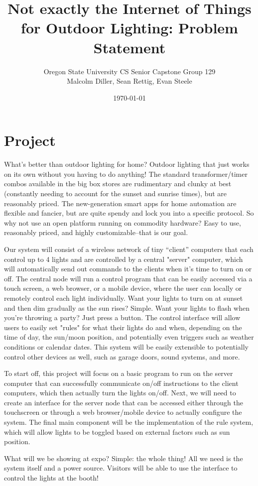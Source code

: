 \documentclass{article}
\title{Not exactly the Internet of Things for Outdoor Lighting: Problem Statement}
\author{Oregon State University CS Senior Capstone Group 129\\Malcolm Diller, Sean Rettig, Evan Steele}
\date{\today}
\begin{document}
\maketitle

\section{Project}

What's better than outdoor lighting for home?  Outdoor lighting that just works
on its own without you having to do anything!  The standard transformer/timer
combos available in the big box stores are rudimentary and clunky at best
(constantly needing to account for the sunset and sunrise times), but are
reasonably priced. The new-generation smart apps for home automation are
flexible and fancier, but are quite spendy and lock you into a specific
protocol.  So why not use an open platform running on commodity hardware?  Easy
to use, reasonably priced, and highly customizable--that is our goal.

Our system will consist of a wireless network of tiny “client” computers that
each control up to 4 lights and are controlled by a central "server" computer,
which will automatically send out commands to the clients when it's time to
turn on or off.  The central node will run a control program that can be easily
accessed via a touch screen, a web browser, or a mobile device, where the user
can locally or remotely control each light individually.  Want your lights to
turn on at sunset and then dim gradually as the sun rises?  Simple.  Want your
lights to flash when you're throwing a party?  Just press a button.  The
control interface will allow users to easily set "rules" for what their lights
do and when, depending on the time of day, the sun/moon position, and
potentially even triggers such as weather conditions or calendar dates.  This
system will be easily extensible to potentially control other devices as well,
such as garage doors, sound systems, and more.

To start off, this project will focus on a basic program to run on the server
computer that can successfully communicate on/off instructions to the client
computers, which then actually turn the lights on/off.  Next, we will need to
create an interface for the server node that can be accessed either through the
touchscreen or through a web browser/mobile device to actually configure the
system.  The final main component will be the implementation of the rule
system, which will allow lights to be toggled based on external factors such as
sun position.

What will we be showing at expo?  Simple: the whole thing!  All we need is the
system itself and a power source.  Visitors will be able to use the interface
to control the lights at the booth!
\end{document}
